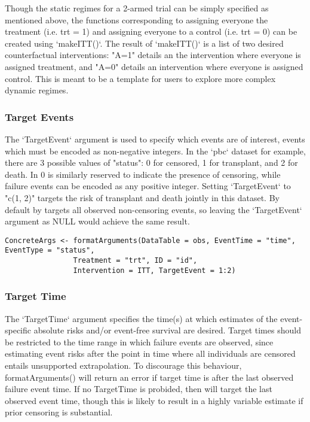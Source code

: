 \documentclass{report}
\newcommand{\1}{\ensuremath{\mathbf{1}}}
\begin{document}
Though the static regimes for a 2-armed trial can be simply specified as mentioned above, the functions corresponding to assigning everyone the treatment (i.e. trt = 1) and assigning everyone to a control (i.e. trt = 0) can be created using `makeITT()`. The result of `makeITT()` is a list of two desired counterfactual interventions: "A=1" details an the intervention where everyone is assigned treatment, and "A=0" details an intervention where everyone is assigned control. This is meant to be a template for users to explore more complex dynamic regimes.

\subsubsection{Target Events}
\label{sec:org20cff56}
The `TargetEvent` argument is used to specify which events are of interest, events which must be encoded as non-negative integers. In the `pbc` dataset for example, there are 3 possible values of "status": 0 for censored, 1 for transplant, and 2 for death. In  0 is similarly reserved to indicate the presence of censoring, while failure events can be encoded as any positive integer. Setting `TargetEvent` to "c(1, 2)" targets the risk of transplant and death jointly in this dataset. By default  by targets all observed non-censoring events, so leaving the `TargetEvent` argument as NULL would achieve the same result.

\begin{lstlisting}
ConcreteArgs <- formatArguments(DataTable = obs, EventTime = "time", EventType = "status", 
				Treatment = "trt", ID = "id", 
				Intervention = ITT, TargetEvent = 1:2)
\end{lstlisting}

\subsubsection{Target Time}
\label{sec:org8a27f76}
The `TargetTime` argument specifies the time(s) at which estimates of the event-specific absolute risks and/or event-free survival are desired. Target times should be restricted to the time range in which failure events are observed, since estimating event risks after the point in time where all individuals are censored entails unsupported extrapolation. To discourage this behaviour, formatArguments() will return an error if target time is after the last observed failure event time. If no TargetTime is probided, then  will target the last observed event time, though this is likely to result in a highly variable estimate if prior censoring is substantial.
\end{document}
